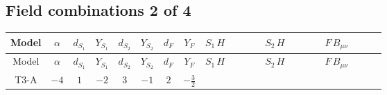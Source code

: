\documentclass[8pt]{article}
\begin{document}
\begin{landscape}
\subsection*{Field combinations 2 of 4}
\begin{longtable}{@{}cccccccc >{\raggedright\arraybackslash}p{0.21\linewidth} >{\raggedright\arraybackslash}p{0.21\linewidth} >{\raggedright\arraybackslash}p{0.21\linewidth}@{}}
\toprule
Model & $\alpha$ & $d_{S_1}$ & $Y_{S_1}$ & $d_{S_2}$ & $Y_{S_2}$ & $d_F$ & $Y_F$ & $S_1\,H$ & $S_2\,H$ & $F\,B_{\mu\nu}$ \\
\midrule
\endfirsthead
\toprule
Model & $\alpha$ & $d_{S_1}$ & $Y_{S_1}$ & $d_{S_2}$ & $Y_{S_2}$ & $d_F$ & $Y_F$ & $S_1\,H$ & $S_2\,H$ & $F\,B_{\mu\nu}$ \\
\midrule
\endhead
T3-A & $-4$ & $1$ & $-2$ & $3$ & $-1$ & $2$ & $-\frac{3}{2}$ & \scriptsize\adjustbox{max width=\linewidth}{$\begin{gathered} +\frac{\hbar  H_{a_3} H_{a_4} H_{a_1}{}^{\dagger } H_{a_2}{}^{\dagger } \mathcal{I}_{H1,a_1,a_3}{}^1 \mathcal{I}_{H1,a_2,a_4}{}^1 \left(\lambda_{HS_1}^{(1)}^{(1)}\right){}^2}{2 \epsilon } \\ +\frac{1}{2} \hbar  \log \left(\frac{\bar{\mu}^{2}}{m_1^2}\right) H_{a_3} H_{a_4} H_{a_1}{}^{\dagger } H_{a_2}{}^{\dagger } \mathcal{I}_{H1,a_1,a_3}{}^1 \mathcal{I}_{H1,a_2,a_4}{}^1 \left(\lambda_{HS_1}^{(1)}^{(1)}\right){}^2\end{gathered}$} & \scriptsize\adjustbox{max width=\linewidth}{$\begin{gathered} +\frac{3 \hbar  H_{a_1} H_{a_2} H_{a_1}{}^{\dagger } H_{a_2}{}^{\dagger } \left(\lambda_{HS_2}^{(1)}^{(2)}\right){}^2}{2 \epsilon } \\ +\frac{3}{2} \hbar  \log \left(\frac{\bar{\mu}^{2}}{m_2^2}\right) H_{a_1} H_{a_2} H_{a_1}{}^{\dagger } H_{a_2}{}^{\dagger } \left(\lambda_{HS_2}^{(1)}^{(2)}\right){}^2\end{gathered}$} & \scriptsize\adjustbox{max width=\linewidth}{$\begin{gathered} -\frac{9}{2} \hbar  \log \left(\frac{\bar{\mu}^{2}}{M_F^2}\right) B_{\mu _1\mu _2}^2\end{gathered}$} \\
\midrule

\end{longtable}
\end{landscape}
\end{document}
